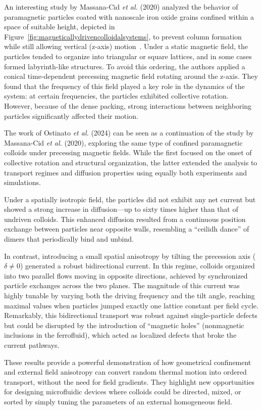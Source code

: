 An interesting study by Massana-Cid \textit{et al.} (2020) analyzed the behavior of paramagnetic particles coated with nanoscale iron oxide grains confined within a space of suitable height, depicted in Figure~\ref{fig:magneticallydrivencolloidalsystems}, to prevent column formation while still allowing vertical (z-axis) motion~\cite{massana2020emergent}. Under a static magnetic field, the particles tended to organize into triangular or square lattices, and in some cases formed labyrinth-like structures. To avoid this ordering, the authors applied a conical time-dependent precessing magnetic field rotating around the z-axis. They found that the frequency of this field played a key role in the dynamics of the system: at certain frequencies, the particles exhibited collective rotation. However, because of the dense packing, strong interactions between neighboring particles significantly affected their motion.

The work of Ostinato \textit{et al.} (2024) can be seen as a continuation of the study by Massana-Cid \textit{et al.} (2020), exploring the same type of confined paramagnetic colloids under precessing magnetic fields. While the first focused on the onset of collective rotation and structural organization, the latter extended the analysis to transport regimes and diffusion properties using equally both experiments and simulations.

Under a spatially isotropic field, the particles did not exhibit any net current but showed a strong increase in diffusion—up to sixty times higher than that of undriven colloids. This enhanced diffusion resulted from a continuous position exchange between particles near opposite walls, resembling a ``ceilidh dance'' of dimers that periodically bind and unbind.


In contrast, introducing a small spatial anisotropy by tilting the precession axis ($\delta \neq 0$) generated a robust bidirectional current. In this regime, colloids organized into two parallel flows moving in opposite directions, achieved by synchronized particle exchanges across the two planes. The magnitude of this current was highly tunable by varying both the driving frequency and the tilt angle, reaching maximal values when particles jumped exactly one lattice constant per field cycle. Remarkably, this bidirectional transport was robust against single-particle defects but could be disrupted by the introduction of ``magnetic holes'' (nonmagnetic inclusions in the ferrofluid), which acted as localized defects that broke the current pathways.

These results provide a powerful demonstration of how geometrical confinement and external field anisotropy can convert random thermal motion into ordered transport, without the need for field gradients. They highlight new opportunities for designing microfluidic devices where colloids could be directed, mixed, or sorted by simply tuning the parameters of an external homogeneous field.

